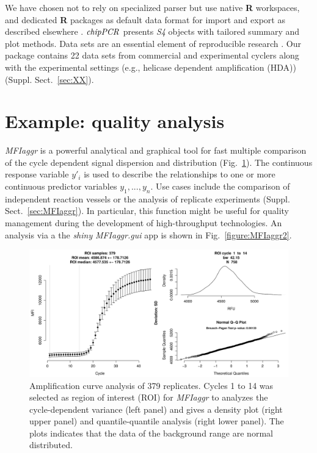 \documentclass{bioinfo}
\begin{document}
\begin{methods}
We have chosen not to rely on specialized parser but use native \textbf{R} 
workspaces, and dedicated \textbf{R} packages as default data format for import 
and export as described elsewhere . 
$\emph{chipPCR}$ presents \emph{S4} objects with tailored summary and plot 
methods. Data sets are an essential element of reproducible research 
\citep{Leeper_2014}. Our package contains 22 data sets from commercial and 
experimental cyclers along with the experimental settings (e.g., helicase 
dependent amplification (HDA)) (Suppl. Sect.~\ref{sec:XX}).
\end{methods}

\section{Example: quality analysis}

\textsl{MFIaggr} is a powerful analytical and graphical tool for fast multiple 
comparison of the cycle dependent signal dispersion and distribution 
(Fig.~\ref{fig:01}). The continuous response variable $y'_i$ is used to 
describe the relationships to one or more continuous predictor variables $y_1, 
..., y_n$. Use cases include the comparison of independent reaction vessels or 
the analysis of replicate experiments (Suppl. Sect.~\ref{sec:MFIaggr}). In 
particular, this function might be useful for quality management during the 
development of high-throughput technologies. An analysis via a the \emph{shiny} 
\textsl{MFIaggr.gui} app is shown in Fig.~\ref{figure:MFIaggr2}.

\begin{figure}[!tpb]%
\centerline{\includegraphics{fig01.jpg}}
\caption{Amplification curve analysis of 379 replicates. Cycles 1 to 14 was 
selected as region of interest (ROI) for \textsl{MFIaggr} to analyzes the 
cycle-dependent variance (left panel) and gives a density plot (right upper 
panel) and quantile-quantile analysis (right lower panel). The plots indicates 
that the data of the background range are normal distributed.}\label{fig:01}
\end{figure}
\end{document}
